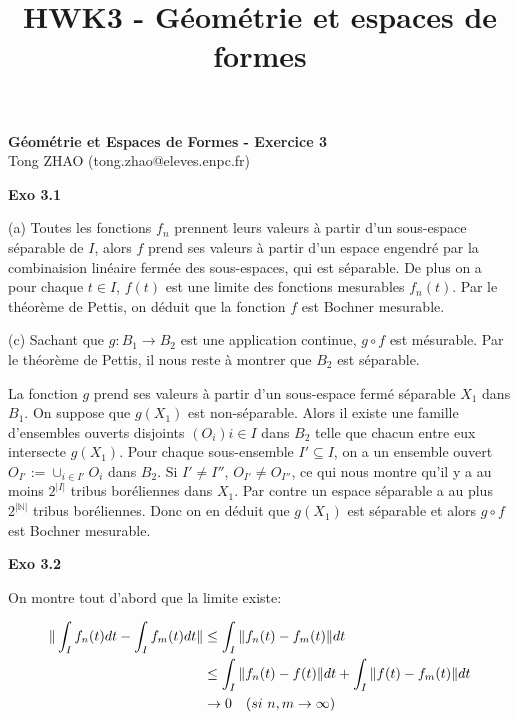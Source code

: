 \documentclass[11pt]{article}
\begin{document}
    
    \title{HWK3 - Géométrie et espaces de formes}
    
    \thispagestyle{empty}
    
    \begin{center}
    {\LARGE \bf Géométrie et Espaces de Formes - Exercice 3}\\
    \vspace{1em}
    {\large Tong ZHAO (tong.zhao@eleves.enpc.fr)}\\
    \end{center}

    \textbf{Exo 3.1}

    (a) Toutes les fonctions $f_n$ prennent leurs valeurs à partir d'un sous-espace séparable de $I$,
    alors $f$ prend ses valeurs à partir d'un espace engendré par la combinaision linéaire fermée des sous-espaces, qui est séparable.
    De plus on a pour chaque $t \in I$, $f(t)$ est une limite des fonctions mesurables $f_n(t)$. 
    Par le théorème de Pettis, on déduit que la fonction $f$ est Bochner mesurable.

    (c) Sachant que $g: B_1 \to B_2$ est une application continue, $g \circ f$ est mésurable. 
    Par le théorème de Pettis, il nous reste à montrer que $B_2$ est séparable. 
    
    La fonction $g$ prend ses valeurs à partir d'un sous-espace fermé séparable $X_1$ dans $B_1$. On suppose que $g(X_1)$ est non-séparable. 
    Alors il existe une famille d'ensembles ouverts disjoints $(O_i)i \in I$ dans $B_2$ telle que chacun entre eux intersecte $g(X_1)$. 
    Pour chaque sous-ensemble $I' \subseteq I$, on a un ensemble ouvert $O_{I'} := \cup_{i \in I'} O_i$ dans $B_2$. 
    Si $I' \neq I''$, $O_{I'} \neq O_{I''}$, ce qui nous montre qu'il y a au moins $2^{|I|}$ tribus boréliennes dans $X_1$.
    Par contre un espace séparable a au plus $2^{|\mathbb{N}|}$ tribus boréliennes. Donc on en déduit que $g(X_1)$ est séparable et alors $g \circ f$ est Bochner mesurable.

    \textbf{Exo 3.2} 

    On montre tout d'abord que la limite existe:

    \vspace{-4em}
    \begin{align*}
      \|\int_I f_n(t) dt - \int_I f_m(t) dt\| &\le \int_I \|f_n(t) - f_m(t)\| dt\\
      &\le \int_I \|f_n(t) - f(t)\|dt + \int_I \|f(t) - f_m(t)\| dt \\
      &\to 0 \mbox{\quad} (si \ n,m \to \infty)
    \end{align*}
    \vspace{-4em}
\end{document}
